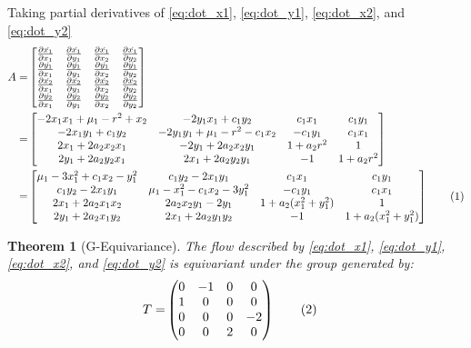 \documentclass[]{article}
\newcommand\numberthis{\addtocounter{equation}{1}\tag{\theequation}}
\newtheorem{thm}{Theorem}
\begin{document}
Taking partial derivatives of \eqref{eq:dot_x1}, \eqref{eq:dot_y1}, \eqref{eq:dot_x2}, and \eqref{eq:dot_y2}
\begin{align*}
	A =& \begin{bmatrix}
		\frac{\partial \dot{x_1}}{\partial {x_1}}&\frac{\partial \dot{x_1}}{\partial {y_1}}&\frac{\partial \dot{x_1}}{\partial {x_2}}&\frac{\partial \dot{x_1}}{\partial {y_2}}\\
		\frac{\partial \dot{y_1}}{\partial {x_1}}&\frac{\partial \dot{y_1}}{\partial {y_1}}&\frac{\partial \dot{y_1}}{\partial {x_2}}&\frac{\partial \dot{y_1}}{\partial {y_2}}\\
		\frac{\partial \dot{x_2}}{\partial {x_1}}&\frac{\partial \dot{x_2}}{\partial {y_1}}&\frac{\partial \dot{x_2}}{\partial {x_2}}&\frac{\partial \dot{x_2}}{\partial {y_2}}\\
		\frac{\partial \dot{y_2}}{\partial {x_1}}&\frac{\partial \dot{y_2}}{\partial {y_1}}&\frac{\partial \dot{y_2}}{\partial {x_2}}&\frac{\partial \dot{y_2}}{\partial {y_2}}
	\end{bmatrix}\\
	=& \begin{bmatrix}
		-2x_1x_1 + \mu_1-r^2+x_2&-2y_1x_1+c_1y_2&c_1x_1&c_1y_1\\
		-2 x_1y_1 +c_1 y_2&-2y_1y_1+\mu_1-r^2-c_1x_2&-c_1y_1&c_1x_1\\
		2x_1+2a_2x_2x_1&-2y_1+2a_2x_2y_1&1+a_2r^2&1\\
		2y_1+2a_2 y_2 x_1&2x_1+2a_2y_2y_1&-1&1+a_2 r^2
	\end{bmatrix}\\
 =& \begin{bmatrix}
		\mu_1-3x_1^2+c_1x_2-y_1^2&c_1y_2-2x_1y_1&c_1x_1&c_1y_1\\
		c_1y_2-2x_1y_1&\mu_1-x_1^2-c_1x_2-3y_1^2&-c_1y_1&c_1x_1\\
		2x_1+2a_2x_1x_2&2a_2x_2y_1-2y_1&1+a_2(x_1^2+y_1^2)&1\\
		2y_1+2a_2x_1y_2&2x_1+2a_2y_1y_2&-1&1+a_2(x_1^2+ y_1^2)
	\end{bmatrix}\numberthis \label{eq:stability}
\end{align*}
\begin{thm}[G-Equivariance]
	The flow described by \eqref{eq:dot_x1}, \eqref{eq:dot_y1}, \eqref{eq:dot_x2}, and \eqref{eq:dot_y2} is equivariant under the group generated by:
	\begin{align*}
		T =& \begin{pmatrix}
			0&-1&0&0\\
			1&0&0&0\\
			0&0&0&-2\\
			0&0&2&0
		\end{pmatrix} \numberthis \label{eq:two_modes:generator}
	\end{align*}
\end{thm}
\end{document}
